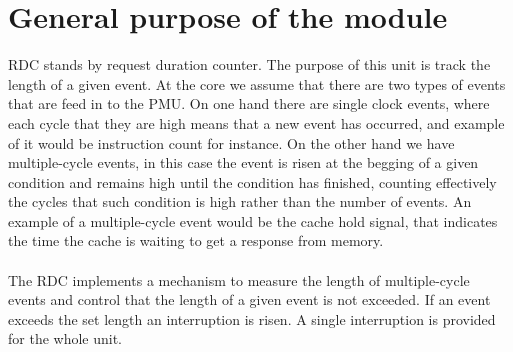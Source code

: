 \newpage
\section{General purpose of the module}
RDC stands by request duration counter. The purpose of this unit is track the length of a given event. At the core we assume that there are two types of events that are feed in to the PMU. On one hand there are single clock events, where each cycle that they are high means that a new event has occurred, and example of it would be instruction count for instance. On the other hand we have multiple-cycle events, in this case the event is risen at the begging of a given condition and remains high until the condition has finished, counting effectively the cycles that such condition is high rather than the number of events. An example of a multiple-cycle event would be the cache hold signal, that indicates the time the cache is waiting to get a response from memory.\\
\\
The RDC implements a mechanism to measure the length of multiple-cycle events and control that the length of a given event is not exceeded. If an event exceeds the set length an interruption is risen. A single interruption is provided for the whole unit. 